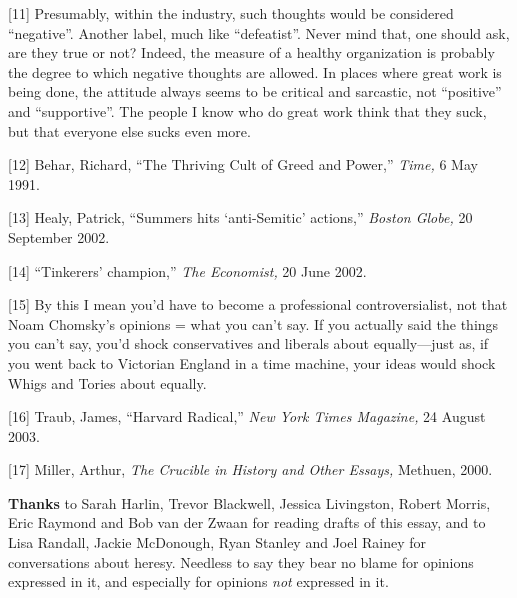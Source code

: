 {[}11{]} Presumably, within the industry, such thoughts would be
considered ``negative''. Another label, much like ``defeatist''. Never
mind that, one should ask, are they true or not? Indeed, the measure of
a healthy organization is probably the degree to which negative thoughts
are allowed. In places where great work is being done, the attitude
always seems to be critical and sarcastic, not ``positive'' and
``supportive''. The people I know who do great work think that they
suck, but that everyone else sucks even more.

{[}12{]} Behar, Richard, ``The Thriving Cult of Greed and Power,''
\emph{Time,} 6 May 1991.

{[}13{]} Healy, Patrick, ``Summers hits `anti-Semitic' actions,''
\emph{Boston Globe,} 20 September 2002.

{[}14{]} ``Tinkerers' champion,'' \emph{The Economist,} 20 June 2002.

{[}15{]} By this I mean you'd have to become a professional
controversialist, not that Noam Chomsky's opinions = what you can't say.
If you actually said the things you can't say, you'd shock conservatives
and liberals about equally---just as, if you went back to Victorian
England in a time machine, your ideas would shock Whigs and Tories about
equally.

{[}16{]} Traub, James, ``Harvard Radical,'' \emph{New York Times
Magazine,} 24 August 2003.

{[}17{]} Miller, Arthur, \emph{The Crucible in History and Other
Essays,} Methuen, 2000.

\textbf{Thanks} to Sarah Harlin, Trevor Blackwell, Jessica Livingston,
Robert Morris, Eric Raymond and Bob van der Zwaan for reading drafts of
this essay, and to Lisa Randall, Jackie McDonough, Ryan Stanley and Joel
Rainey for conversations about heresy. Needless to say they bear no
blame for opinions expressed in it, and especially for opinions
\emph{not} expressed in it.
